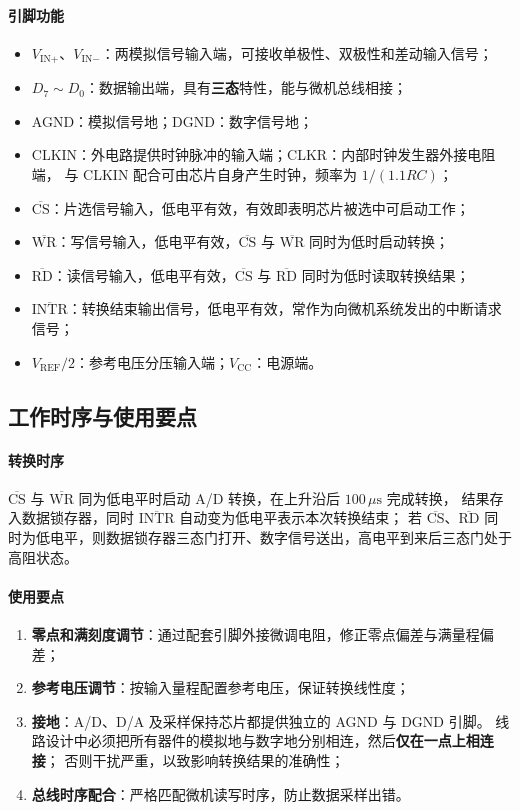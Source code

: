 \paragraph{引脚功能}
\begin{itemize}
    \item $V_{\text{IN}+}$、$V_{\text{IN}-}$：两模拟信号输入端，可接收单极性、双极性和差动输入信号；
    \item $D_7\sim D_0$：数据输出端，具有\textbf{三态}特性，能与微机总线相接；
    \item AGND：模拟信号地；DGND：数字信号地；
    \item CLKIN：外电路提供时钟脉冲的输入端；CLKR：内部时钟发生器外接电阻端，
    与 CLKIN 配合可由芯片自身产生时钟，频率为 $1/(1.1RC)$；
    \item $\overline{\text{CS}}$：片选信号输入，低电平有效，有效即表明芯片被选中可启动工作；
    \item $\overline{\text{WR}}$：写信号输入，低电平有效，$\overline{\text{CS}}$ 与 $\overline{\text{WR}}$ 同时为低时启动转换；
    \item $\overline{\text{RD}}$：读信号输入，低电平有效，$\overline{\text{CS}}$ 与 $\overline{\text{RD}}$ 同时为低时读取转换结果；
    \item $\overline{\text{INTR}}$：转换结束输出信号，低电平有效，常作为向微机系统发出的中断请求信号；
    \item $V_\text{REF}/2$：参考电压分压输入端；$V_\text{CC}$：电源端。
\end{itemize}

\subsection{工作时序与使用要点}
\paragraph{转换时序}
$\overline{\text{CS}}$ 与 $\overline{\text{WR}}$ 同为低电平时启动 A/D 转换，在上升沿后 $100\,\mu\mathrm{s}$ 完成转换，
结果存入数据锁存器，同时 $\overline{\text{INTR}}$ 自动变为低电平表示本次转换结束；
若 $\overline{\text{CS}}$、$\overline{\text{RD}}$ 同时为低电平，则数据锁存器三态门打开、数字信号送出，高电平到来后三态门处于高阻状态。

\paragraph{使用要点}
\begin{enumerate}
    \item \textbf{零点和满刻度调节}：通过配套引脚外接微调电阻，修正零点偏差与满量程偏差；
    \item \textbf{参考电压调节}：按输入量程配置参考电压，保证转换线性度；
    \item \textbf{接地}：A/D、D/A 及采样保持芯片都提供独立的 AGND 与 DGND 引脚。
    线路设计中必须把所有器件的模拟地与数字地分别相连，然后\textbf{仅在一点上相连接}；
    否则干扰严重，以致影响转换结果的准确性；
    \item \textbf{总线时序配合}：严格匹配微机读写时序，防止数据采样出错。
\end{enumerate}

